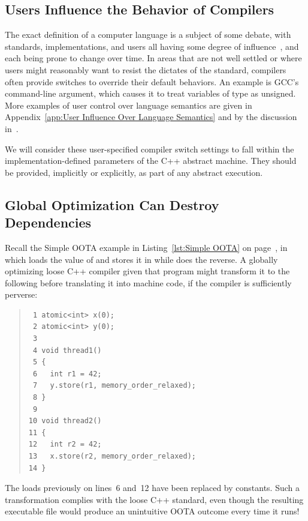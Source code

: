 \documentclass[10]{article}
\begin{document}
\subsection{Users Influence the Behavior of Compilers}
\label{sec:Users Influence the Behavior of Compilers}

The exact definition of a computer language is a subject of some debate,
with standards, implementations, and users all having some degree of
influence~\cite{KayvanMemarian2016DepthOfC-1,KayvanMemarian2016DepthOfC-2},
and each being prone to change over time.
In areas that are not well settled or where users might reasonably
want to resist the dictates of the standard,
compilers often provide switches to override their default behaviors.
An example is GCC's  command-line argument,
which causes it to treat variables of type  as unsigned.
More examples of user control over language semantics are given in
Appendix~\ref{app:User Influence Over Language Semantics}
and by the discussion
in~\cite{KayvanMemarian2016DepthOfC-1,KayvanMemarian2016DepthOfC-2}.

We will consider these user-specified compiler switch settings to fall
within the implementation-defined parameters of the C++ abstract machine.
They should be provided, implicitly or explicitly, as part of any
abstract execution.

\subsection{Global Optimization Can Destroy Dependencies}
\label{sec:Global Optimization Can Destroy Dependencies}

Recall the Simple OOTA example in Listing~\ref{lst:Simple OOTA} on
page~\pageref{lst:Simple OOTA},
in which  loads the value of  and stores it in
 while  does the reverse.
A globally optimizing loose C++ compiler given that program might
transform it to the following before translating it into machine code,
if the compiler is sufficiently perverse:
\begin{quote}
\begin{verbatim}
 1 atomic<int> x(0);
 2 atomic<int> y(0);
 3
 4 void thread1()
 5 {
 6   int r1 = 42;
 7   y.store(r1, memory_order_relaxed);
 8 }
 9
10 void thread2()
11 {
12   int r2 = 42;
13   x.store(r2, memory_order_relaxed);
14 }
\end{verbatim}
\end{quote}
The loads previously on lines~6 and~12 have been replaced by constants.
Such a transformation complies with the loose C++ standard,
even though the resulting executable file would produce an unintuitive
OOTA outcome every time it runs!
\end{document}
